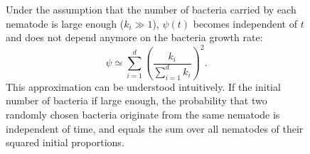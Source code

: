 \documentclass[10pt]{article}
\begin{document}
\begin{multicols}{2}
\begin{figure}[hbtp!]
\begin{mdframed}
\begin{multicols}{2}
\begin{equation}
\end{equation}
Under the assumption that the number of bacteria carried by each nematode is large enough ($k_i \gg 1$), $\psi(t)$ becomes independent of $t$ and does not depend anymore on
 the bacteria growth rate:
 \begin{equation}
\psi \simeq \displaystyle \sum_{i=1}^d \left( \dfrac{ k_i}{\sum_{i=1}^d k_i} \right)^2.
 \end{equation}
 This approximation can be understood intuitively.
 If the initial number of bacteria if large enough, the probability that two randomly chosen bacteria originate from the same nematode is independent of time, and equals the sum over all nematodes of their squared initial proportions.
 \end{multicols}
 \end{mdframed}
\end{figure}
 \begin{figure}[hbt!]
\centering
{}
\end{figure}
\end{multicols}
\end{document}
